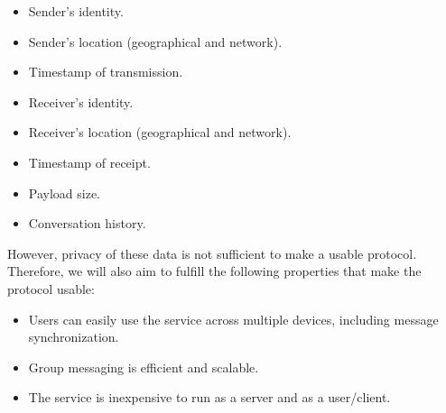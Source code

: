 \begin{itemize}
\item
  Sender's identity.
\item
  Sender's location (geographical and network).
\item
  Timestamp of transmission.
\item
  Receiver's identity.
\item
  Receiver's location (geographical and network).
\item
  Timestamp of receipt.
\item
  Payload size.
\item
  Conversation history.
\end{itemize}

However, privacy of these data is not sufficient to make a usable protocol. Therefore, we will also aim to fulfill the following properties that make the protocol usable:

\begin{itemize}
\item
  Users can easily use the service across multiple devices, including message synchronization.
\item
  Group messaging is efficient and scalable.
\item
  The service is inexpensive to run as a server and as a user/client.
\end{itemize}
